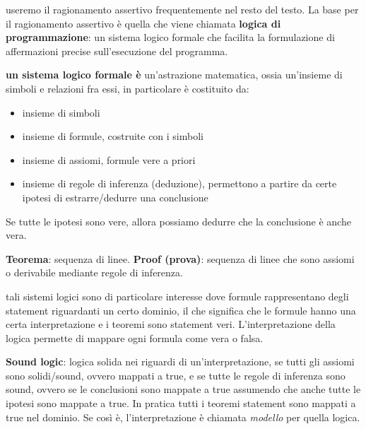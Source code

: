 \documentclass[10pt,a4paper]{article}
\begin{document}
useremo il ragionamento assertivo frequentemente nel resto del testo.
La base per il ragionamento assertivo è quella che viene chiamata \textbf{logica di programmazione}:
un sistema logico formale che facilita la formulazione di affermazioni precise sull'esecuzione del programma.

\textbf{un sistema logico formale è} un'astrazione matematica, ossia un'insieme di simboli e relazioni fra essi, in particolare è costituito da:
\begin{itemize}
\item insieme di simboli
\item insieme di formule, costruite con i simboli
\item insieme di assiomi, formule vere a priori
\item insieme di regole di inferenza (deduzione), permettono a partire da certe ipotesi di estrarre/dedurre una conclusione
\end{itemize}
Se tutte le ipotesi sono vere, allora possiamo dedurre che la conclusione è anche vera.

\textbf{Teorema}: sequenza di linee.
\textbf{Proof (prova)}: sequenza di linee che sono assiomi o derivabile mediante regole di inferenza.

tali sistemi logici sono di particolare interesse dove formule rappresentano degli statement riguardanti un certo dominio, il che significa che le formule hanno una certa interpretazione e i teoremi sono statement veri.
L'interpretazione della logica permette di mappare ogni formula come vera o falsa.

\textbf{Sound logic}: logica solida nei riguardi di un'interpretazione, se tutti gli assiomi sono solidi/sound, ovvero mappati a true, e se tutte le regole di inferenza sono sound, ovvero se le conclusioni sono mappate a true assumendo che anche tutte le ipotesi sono mappate a true.
In pratica tutti i teoremi statement sono mappati a true nel dominio. Se così è, l'interpretazione è chiamata \textit{modello} per quella logica.
\end{document}
